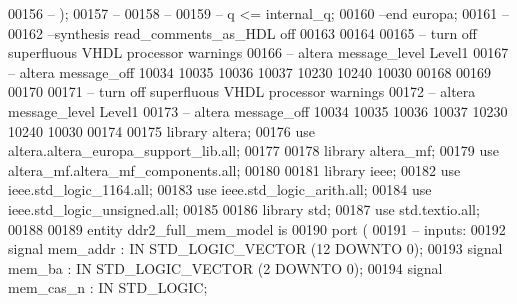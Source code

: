 \begin{DoxyCode}
00156 \textcolor{keyword}{--    );}
00157 \textcolor{keyword}{--}
00158 \textcolor{keyword}{--  }
00159 \textcolor{keyword}{--  q <= internal\_q;}
00160 \textcolor{keyword}{--end europa;}
00161 \textcolor{keyword}{--}
00162 \textcolor{keyword}{--synthesis read\_comments\_as\_HDL off}
00163 
00164 
00165 \textcolor{keyword}{-- turn off superfluous VHDL processor warnings }
00166 \textcolor{keyword}{-- altera message\_level Level1 }
00167 \textcolor{keyword}{-- altera message\_off 10034 10035 10036 10037 10230 10240 10030 }
00168 
00169 
00170 
00171 \textcolor{keyword}{-- turn off superfluous VHDL processor warnings }
00172 \textcolor{keyword}{-- altera message\_level Level1 }
00173 \textcolor{keyword}{-- altera message\_off 10034 10035 10036 10037 10230 10240 10030 }
00174 
00175 \textcolor{vhdlkeyword}{library }\textcolor{keywordflow}{altera};
00176 \textcolor{vhdlkeyword}{use }altera.altera\_europa\_support\_lib.\textcolor{keywordflow}{all};
00177 
00178 \textcolor{vhdlkeyword}{library }\textcolor{keywordflow}{altera\_mf};
00179 \textcolor{vhdlkeyword}{use }altera_mf.altera\_mf\_components.\textcolor{keywordflow}{all};
00180 
00181 \textcolor{vhdlkeyword}{library }\textcolor{keywordflow}{ieee};
00182 \textcolor{vhdlkeyword}{use }ieee.std\_logic\_1164.\textcolor{keywordflow}{all};
00183 \textcolor{vhdlkeyword}{use }ieee.std\_logic\_arith.\textcolor{keywordflow}{all};
00184 \textcolor{vhdlkeyword}{use }ieee.std\_logic\_unsigned.\textcolor{keywordflow}{all};
00185 
00186 \textcolor{vhdlkeyword}{library }\textcolor{keywordflow}{std};
00187 \textcolor{vhdlkeyword}{use }std.textio.\textcolor{keywordflow}{all};
00188 
00189 \textcolor{keywordflow}{entity }ddr2_full_mem_model \textcolor{keywordflow}{is} 
00190         \textcolor{keywordflow}{port} \textcolor{vhdlchar}{(}
00191 \textcolor{keyword}{              -- inputs:}
00192                  \textcolor{keywordflow}{signal} \textcolor{vhdlchar}{mem_addr} \textcolor{vhdlchar}{:} \textcolor{keywordflow}{IN} \textcolor{comment}{STD\_LOGIC\_VECTOR} \textcolor{vhdlchar}{(}\textcolor{vhdllogic}{}\textcolor{vhdllogic}{12} \textcolor{keywordflow}{DOWNTO} \textcolor{vhdllogic}{}\textcolor{vhdllogic}{0}\textcolor{vhdlchar}{)};
00193                  \textcolor{keywordflow}{signal} \textcolor{vhdlchar}{mem_ba} \textcolor{vhdlchar}{:} \textcolor{keywordflow}{IN} \textcolor{comment}{STD\_LOGIC\_VECTOR} \textcolor{vhdlchar}{(}\textcolor{vhdllogic}{}\textcolor{vhdllogic}{2} \textcolor{keywordflow}{DOWNTO} \textcolor{vhdllogic}{}\textcolor{vhdllogic}{0}\textcolor{vhdlchar}{)};
00194                  \textcolor{keywordflow}{signal} \textcolor{vhdlchar}{mem_cas_n} \textcolor{vhdlchar}{:} \textcolor{keywordflow}{IN} \textcolor{comment}{STD\_LOGIC};

\end{DoxyCode}
